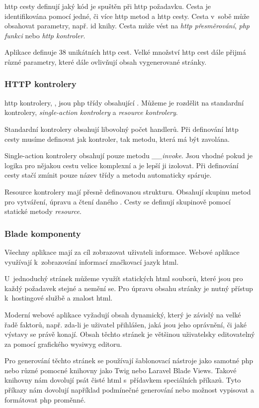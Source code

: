 \acrshort{http} cesty definují jaký kód je spuštěn při \acrshort{http} požadavku. Cesta je identifikována pomocí jedné, či více \acrshort{http} metod a \acrshort{http} cesty. Cesta v~sobě může obsahovat parametry, např. id knihy. Cesta může vést na \emph{\acrshort{http} přesměrování}, \emph{\acrshort{php} funkci} nebo \emph{\acrshort{http} kontroler}.

Aplikace \bso{} definuje 38 unikátních \acrshort{http} cest. Velké množství \acrshort{http} cest dále přijmá různé parametry, které dále ovlivňují obsah vygenerované stránky.

\subsubsection{HTTP kontrolery}

\acrshort{http} kontrolery, \inlaravel, jsou \acrshort{php} třídy obsahující . Můžeme je rozdělit na standardní kontrolery, \emph{single-action kontrolery}\cite{laravel-controller-single-action} a \emph{resource kontrolery}\cite{laravel-controller-resource}.

Standardní kontrolery obsahují libovolný počet handlerů. Při definování \acrshort{http} cesty musíme definovat jak kontroler, tak metodu, která má být zavolána.

Single-action kontrolery obsahují pouze metodu \emph{\_\_invoke}. Jsou vhodné pokud je logika pro nějakou cestu velice komplexní a je lepší ji izolovat. Při definování cesty stačí zmínit pouze název třídy a  metodu automaticky spáruje.

Resource kontrolery mají přesně definovanou strukturu. Obsahují skupinu metod pro vytváření, úpravu a čtení daného . Cesty se definují skupinově pomocí statické metody \emph{resource}.

\subsubsection{Blade komponenty}

Všechny aplikace mají za cíl zobrazovat uživateli informace. Webové aplikace využívají k~zobrazování informací značkovací jazyk \acrshort{html}.

U~jednoduchý stránek můžeme využít statických \acrshort{html} souborů, které jsou pro každý požadavek stejné a nemění se. Pro úpravu obsahu stránky je nutný přístup k~hostingové službě a znalost \acrshort{html}.

Moderní webové aplikace vyžadují obsah dynamický, který je závislý na velké řadě faktorů, např. zda-li je uživatel přihlášen, jaká jsou jeho oprávnění, či jaké výstavy se právě konají. Obsah těchto stránek je většinou uživatelsky editovatelný za pomocí grafického \acrshort{wysiwyg} editoru.

Pro generování těchto stránek se používají šablonovací nástroje jako samotné \acrshort{php} nebo různé pomocné knihovny jako Twig\cite{twig} nebo Laravel Blade Views\cite{laravel-blade}.
Takové knihovny nám dovolují psát čisté \acrshort{html} s~přídavkem speciálních příkazů.
Tyto příkazy nám dovolují například podmínečné generování nebo možnost vypisovat a formátovat \acrshort{php} proměnné.

